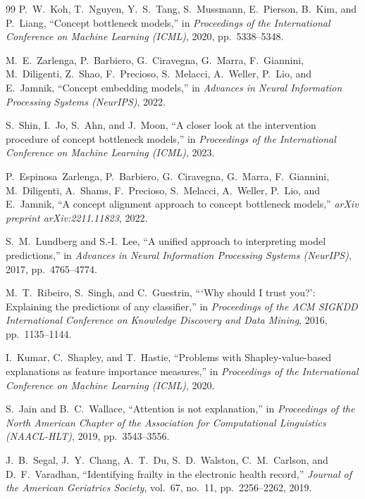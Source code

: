 \documentclass[review,12pt,authoryear]{elsarticle}
\begin{document}
\begin{thebibliography}{99}
P.~W.~Koh, T.~Nguyen, Y.~S.~Tang, S.~Mussmann, E.~Pierson, B.~Kim, and P.~Liang, ``Concept bottleneck models,'' in \textit{Proceedings of the International Conference on Machine Learning (ICML)}, 2020, pp.~5338--5348.

M.~E.~Zarlenga, P.~Barbiero, G.~Ciravegna, G.~Marra, F.~Giannini, M.~Diligenti, Z.~Shao, F.~Precioso, S.~Melacci, A.~Weller, P.~Lio, and E.~Jamnik, ``Concept embedding models,'' in \textit{Advances in Neural Information Processing Systems (NeurIPS)}, 2022.

S.~Shin, I.~Jo, S.~Ahn, and J.~Moon, ``A closer look at the intervention procedure of concept bottleneck models,'' in \textit{Proceedings of the International Conference on Machine Learning (ICML)}, 2023.

P.~Espinosa~Zarlenga, P.~Barbiero, G.~Ciravegna, G.~Marra, F.~Giannini, M.~Diligenti, A.~Shams, F.~Precioso, S.~Melacci, A.~Weller, P.~Lio, and E.~Jamnik, ``A concept alignment approach to concept bottleneck models,'' \textit{arXiv preprint arXiv:2211.11823}, 2022.

S.~M.~Lundberg and S.-I.~Lee, ``A unified approach to interpreting model predictions,'' in \textit{Advances in Neural Information Processing Systems (NeurIPS)}, 2017, pp.~4765--4774.

M.~T.~Ribeiro, S.~Singh, and C.~Guestrin, ```Why should I trust you?': Explaining the predictions of any classifier,'' in \textit{Proceedings of the ACM SIGKDD International Conference on Knowledge Discovery and Data Mining}, 2016, pp.~1135--1144.

I.~Kumar, C.~Shapley, and T.~Hastie, ``Problems with Shapley-value-based explanations as feature importance measures,'' in \textit{Proceedings of the International Conference on Machine Learning (ICML)}, 2020.

S.~Jain and B.~C.~Wallace, ``Attention is not explanation,'' in \textit{Proceedings of the North American Chapter of the Association for Computational Linguistics (NAACL-HLT)}, 2019, pp.~3543--3556.

J.~B.~Segal, J.~Y.~Chang, A.~T.~Du, S.~D.~Walston, C.~M.~Carlson, and D.~F.~Varadhan, ``Identifying frailty in the electronic health record,'' \textit{Journal of the American Geriatrics Society}, vol.~67, no.~11, pp.~2256--2262, 2019.


\end{thebibliography}
\end{document}
